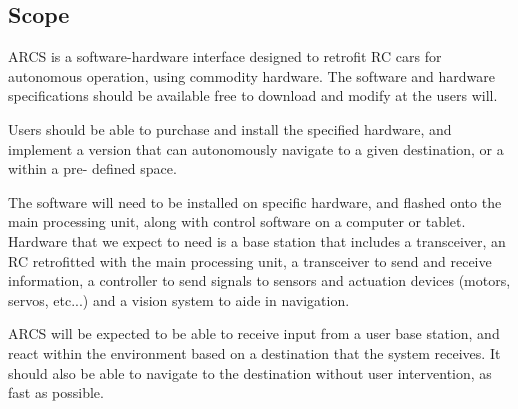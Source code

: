 \documentclass[compsoc,draftclsnofoot,onecolumn,10pt]{IEEEtran}
\begin{document}
\subsection{Scope} %
ARCS is a software-hardware interface designed to retrofit RC cars for autonomous 
operation, using commodity hardware. The software and hardware specifications 
should be available free to download and modify at the users will. \par
Users should be able to purchase and install the specified hardware, and implement a 
version that can autonomously navigate to a given destination, or a within a pre-
defined space.  \par
The software will need to be installed on specific hardware, and flashed onto the 
main processing unit, along with control software on a computer or tablet. Hardware 
that we expect to need is a base station that includes a transceiver, an RC retrofitted 
with the main processing unit, a transceiver to send and receive information, a 
controller to send signals to sensors and actuation devices (motors, servos, etc...) and
a vision system to aide in navigation. \par
ARCS will be expected to be able to receive input from a user base station, and react
within the environment based on a destination that the system receives. It should also
be able to navigate to the destination without user intervention, as fast as possible. \par
\end{document}
